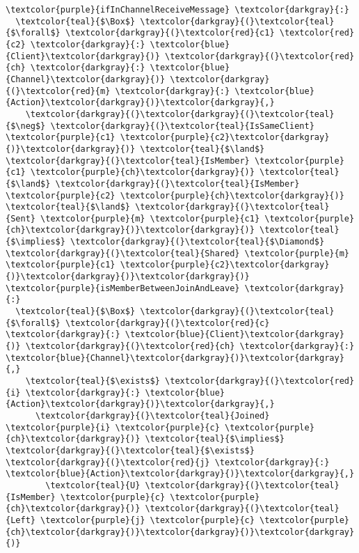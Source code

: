 \begin{Verbatim}[commandchars=\\\{\},codes={\catcode`$=3}]
\textcolor{purple}{ifInChannelReceiveMessage} \textcolor{darkgray}{:} 
  \textcolor{teal}{$\Box$} \textcolor{darkgray}{(}\textcolor{teal}{$\forall$} \textcolor{darkgray}{(}\textcolor{red}{c1} \textcolor{red}{c2} \textcolor{darkgray}{:} \textcolor{blue}{Client}\textcolor{darkgray}{)} \textcolor{darkgray}{(}\textcolor{red}{ch} \textcolor{darkgray}{:} \textcolor{blue}{Channel}\textcolor{darkgray}{)} \textcolor{darkgray}{(}\textcolor{red}{m} \textcolor{darkgray}{:} \textcolor{blue}{Action}\textcolor{darkgray}{)}\textcolor{darkgray}{,} 
    \textcolor{darkgray}{(}\textcolor{darkgray}{(}\textcolor{teal}{$\neg$} \textcolor{darkgray}{(}\textcolor{teal}{IsSameClient} \textcolor{purple}{c1} \textcolor{purple}{c2}\textcolor{darkgray}{)}\textcolor{darkgray}{)} \textcolor{teal}{$\land$} \textcolor{darkgray}{(}\textcolor{teal}{IsMember} \textcolor{purple}{c1} \textcolor{purple}{ch}\textcolor{darkgray}{)} \textcolor{teal}{$\land$} \textcolor{darkgray}{(}\textcolor{teal}{IsMember} \textcolor{purple}{c2} \textcolor{purple}{ch}\textcolor{darkgray}{)} \textcolor{teal}{$\land$} \textcolor{darkgray}{(}\textcolor{teal}{Sent} \textcolor{purple}{m} \textcolor{purple}{c1} \textcolor{purple}{ch}\textcolor{darkgray}{)}\textcolor{darkgray}{)} \textcolor{teal}{$\implies$} \textcolor{darkgray}{(}\textcolor{teal}{$\Diamond$} \textcolor{darkgray}{(}\textcolor{teal}{Shared} \textcolor{purple}{m} \textcolor{purple}{c1} \textcolor{purple}{c2}\textcolor{darkgray}{)}\textcolor{darkgray}{)}\textcolor{darkgray}{)}
\textcolor{purple}{isMemberBetweenJoinAndLeave} \textcolor{darkgray}{:} 
  \textcolor{teal}{$\Box$} \textcolor{darkgray}{(}\textcolor{teal}{$\forall$} \textcolor{darkgray}{(}\textcolor{red}{c} \textcolor{darkgray}{:} \textcolor{blue}{Client}\textcolor{darkgray}{)} \textcolor{darkgray}{(}\textcolor{red}{ch} \textcolor{darkgray}{:} \textcolor{blue}{Channel}\textcolor{darkgray}{)}\textcolor{darkgray}{,} 
    \textcolor{teal}{$\exists$} \textcolor{darkgray}{(}\textcolor{red}{i} \textcolor{darkgray}{:} \textcolor{blue}{Action}\textcolor{darkgray}{)}\textcolor{darkgray}{,} 
      \textcolor{darkgray}{(}\textcolor{teal}{Joined} \textcolor{purple}{i} \textcolor{purple}{c} \textcolor{purple}{ch}\textcolor{darkgray}{)} \textcolor{teal}{$\implies$} \textcolor{darkgray}{(}\textcolor{teal}{$\exists$} \textcolor{darkgray}{(}\textcolor{red}{j} \textcolor{darkgray}{:} \textcolor{blue}{Action}\textcolor{darkgray}{)}\textcolor{darkgray}{,} 
        \textcolor{teal}{U} \textcolor{darkgray}{(}\textcolor{teal}{IsMember} \textcolor{purple}{c} \textcolor{purple}{ch}\textcolor{darkgray}{)} \textcolor{darkgray}{(}\textcolor{teal}{Left} \textcolor{purple}{j} \textcolor{purple}{c} \textcolor{purple}{ch}\textcolor{darkgray}{)}\textcolor{darkgray}{)}\textcolor{darkgray}{)}

\end{Verbatim}
